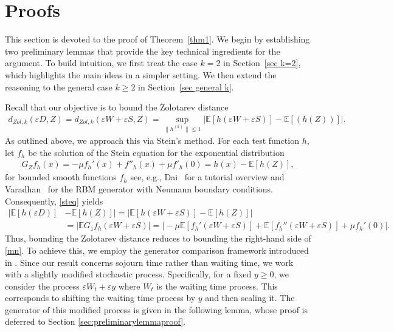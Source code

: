 \documentclass[11pt,letterpaper,reqno]{article}
\theoremstyle{thmstyleone}%
\theoremstyle{thmstyletwo}%
\theoremstyle{thmstylethree}%
\numberwithin{equation}{section}
\begin{document}
\section{Proofs}\label{sec:proofs}
This section is devoted to the proof of Theorem~\ref{thm1}. We begin by establishing two preliminary lemmas that provide the key technical ingredients for the argument. To build intuition, we first treat the case $k=2$ in Section~\ref{sec k=2}, which highlights the main ideas in a simpler setting. We then extend the reasoning to the general case $k \geq 2$ in Section~\ref{sec general k}.

Recall that our objective is to bound the Zolotarev distance 
\begin{align*}
    d_{Zol,k}(\varepsilon D,Z)= d_{Zol,k}(\varepsilon W+\varepsilon S,Z)=\sup_{\|h^{(k)}\| \leq 1}|\mathbb E[h(\varepsilon W+\varepsilon S)]-\mathbb E[(h(Z))]|.
\end{align*}
As outlined above, we approach this via Stein's method. For each test function $h$, let $f_h$ be the solution of the Stein equation for the exponential distribution 
\begin{align}\label{steq}
     G_{Z}f_h(x)= -\mu f_h'(x)+ f''_h(x)+\mu f'_h(0)=h(x)-\mathbb E[h(Z)],
\end{align}
for bounded smooth functions $f_h$ see, e.g., Dai~\cite{Dai17} for a tutorial overview and Varadhan~\cite[Chapter 16]{Varadhan11} for the RBM generator with Neumann boundary conditions. 
Consequently, \eqref{steq} yields 
\begin{align}\label{mn}
    |\mathbb E[h(\varepsilon D)]&-\mathbb E[h(Z)]|= |\mathbb E[h(\varepsilon W+\varepsilon S)]-\mathbb E[h(Z)]| \nonumber\\
    &=|\mathbb EG_{z}f_h(\varepsilon W+\varepsilon S)|=\Big|-\mu \mathbb E[f_h'(\varepsilon W+\varepsilon S)]+ \mathbb E[f_h''(\varepsilon W+\varepsilon S)]+\mu f_h'(0)\Big|.
\end{align}
Thus, bounding the Zolotarev distance reduces to bounding the right-hand side of \eqref{mn}. To achieve this, we employ the generator comparison framework introduced in \cite{BDF}. Since our result concerns sojourn time rather than waiting time, we work with a slightly modified stochastic process. 
Specifically, for a fixed $y \geq 0$, we consider the process $\varepsilon W_t+\varepsilon y$ where $W_t$ is the waiting time process. This corresponds to shifting the waiting time process by $y$ and then scaling it. The generator of this modified process is given in the following lemma, whose proof is deferred to Section \ref{sec:preliminarylemmaproof}.
\end{document}
